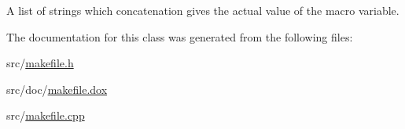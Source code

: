 A list of strings which concatenation gives the actual value of the macro variable. 



The documentation for this class was generated from the following files\-:\begin{DoxyCompactItemize}
\item 
src/\hyperlink{makefile_8h}{makefile.\-h}\item 
src/doc/\hyperlink{makefile_8dox}{makefile.\-dox}\item 
src/\hyperlink{makefile_8cpp}{makefile.\-cpp}\end{DoxyCompactItemize}
